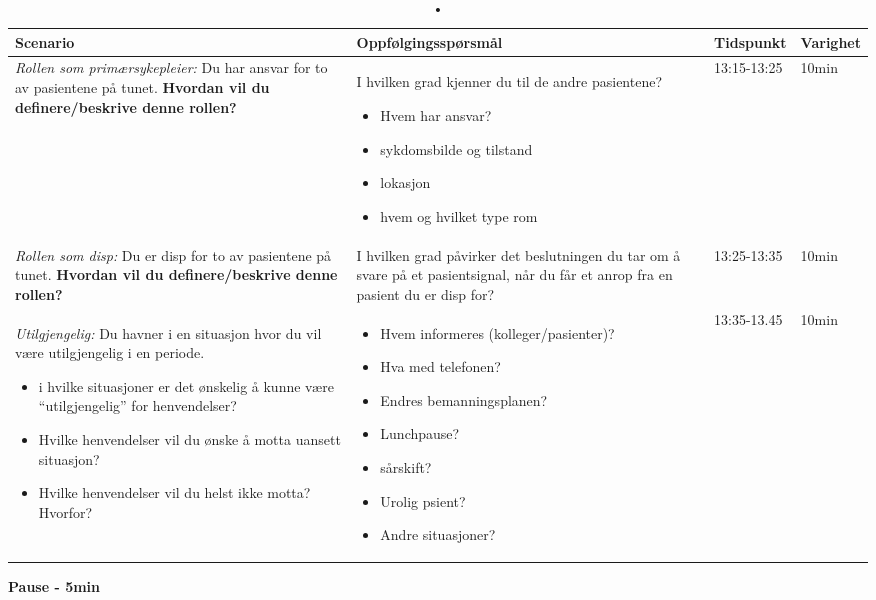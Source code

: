 \begin{table}[H]
\small
\caption{•}
\begin{tabular}{p{4cm}|p{5cm}|l|l}
\hline
\textbf{Scenario} & \textbf{Oppfølgingsspørsmål} & \textbf{Tidspunkt} & \textbf{Varighet}\\
\hline
\emph{Rollen som primærsykepleier:} Du har ansvar for to av pasientene på tunet. \textbf{Hvordan vil du definere/beskrive denne rollen?} & I hvilken grad kjenner du til de andre pasientene? \begin{itemize}
\item Hvem har ansvar?
\item sykdomsbilde og tilstand
\item lokasjon
\item hvem og hvilket type rom
\end{itemize}
& 13:15-13:25 & 10min\\
\hline
\emph{Rollen som disp:} Du er disp for to av pasientene på tunet. \textbf{Hvordan vil du definere/beskrive denne rollen?} & I hvilken grad påvirker det beslutningen du tar om å svare på et pasientsignal, når du får et anrop fra en pasient du er disp for?
 & 13:25-13:35 & 10min\\
\hline
\emph{Utilgjengelig:} Du havner i en situasjon hvor du vil være utilgjengelig i en periode.
\begin{itemize}
\item i hvilke situasjoner er det ønskelig å kunne være “utilgjengelig” for henvendelser?
\item Hvilke henvendelser vil du ønske å motta uansett situasjon?
\item Hvilke henvendelser vil du helst ikke motta? Hvorfor?
\end{itemize}
& 
\begin{itemize}
\item Hvem informeres (kolleger/pasienter)?
\item Hva med telefonen?
\item Endres bemanningsplanen?
\item Lunchpause?
\item sårskift?
\item Urolig psient?
\item Andre situasjoner?
\end{itemize}
& 13:35-13.45 & 10min\\
\end{tabular}
\label{Steg2}
\end{table}

\textbf{Pause - 5min}
\pagebreak
